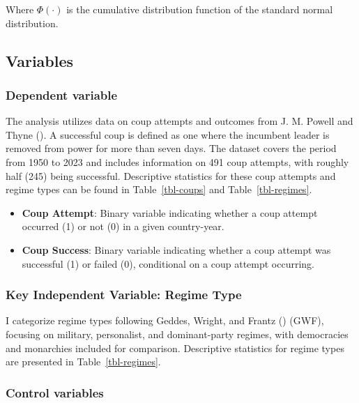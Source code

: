 \documentclass[
  12pt,
]{report}
\begin{document}
Where \(\Phi(\cdot)\) is the cumulative distribution function of the
standard normal distribution.

\subsection{Variables}\label{variables}

\subsubsection{Dependent variable}\label{dependent-variable}

The analysis utilizes data on coup attempts and outcomes from J. M.
Powell and Thyne (). A successful coup is
defined as one where the incumbent leader is removed from power for more
than seven days. The dataset covers the period from 1950 to 2023 and
includes information on 491 coup attempts, with roughly half (245) being
successful. Descriptive statistics for these coup attempts and regime
types can be found in Table~\ref{tbl-coups} and Table~\ref{tbl-regimes}.

\begin{itemize}
\item
  \textbf{Coup Attempt}: Binary variable indicating whether a coup
  attempt occurred (1) or not (0) in a given country-year.
\item
  \textbf{Coup Success}: Binary variable indicating whether a coup
  attempt was successful (1) or failed (0), conditional on a coup
  attempt occurring.
\end{itemize}

\subsubsection{Key Independent Variable: Regime
Type}\label{sec-chapter2322}

I categorize regime types following Geddes, Wright, and Frantz
() (GWF), focusing on military,
personalist, and dominant-party regimes, with democracies and monarchies
included for comparison. Descriptive statistics for regime types are
presented in Table~\ref{tbl-regimes}.

\subsubsection*{Control variables}\label{control-variables}
\end{document}
